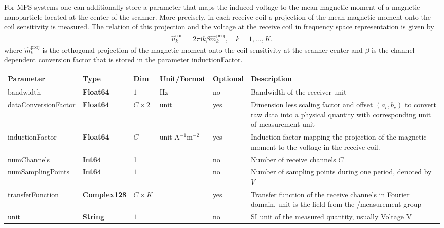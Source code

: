 \documentclass[landscape,a4paper]{article} %
\newcommand{\inltab}[1]{{\ttfamily\bfseries\color{blue}#1}}
\newcommand{\inlvar}[1]{{\ttfamily#1}}
\begin{document}
\begin{multicols}{2}
For MPS systems one can additionally store a parameter that maps the induced voltage to the mean magnetic moment of a magnetic nanoparticle located at the center of the scanner. More precisely, in each receive coil a projection of the mean magnetic moment onto the coil sensitivity is measured. The relation of this projection and the voltage at the receive coil in frequency space representation is given by
\begin{align*}
\hat{u}_k^\text{coil} = 2\pi \textrm{i} k \beta \hat{m}_k^\text{proj} , \quad k=1,\dots,K.
\end{align*}
where  
$\hat m_k^\text{proj}$ is the orthogonal projection of the magnetic moment onto the coil sensitivity at the scanner center
and $\beta$ is the channel dependent conversion factor that is stored in the parameter  \inlvar{inductionFactor}.
\end{multicols}

\noindent \begin{tabularx}{\columnwidth}{lllllX} 
\textbf{Parameter} & \textbf{Type} & \textbf{Dim} & \textbf{Unit/Format} & \textbf{Optional} & \textbf{Description} \\ \hline 
\inlvar{bandwidth} & \inltab{Float64} & $1$ & Hz & no & Bandwidth of the receiver unit \\ \hline
\inlvar{dataConversionFactor} & \inltab{Float64} & $C \times 2$ & \inlvar{unit} & yes & Dimension less scaling factor and offset $(a_c, b_c)$ to convert raw data into a physical quantity with corresponding unit of measurement \inlvar{unit} \\ \hline 
\inlvar{inductionFactor} & \inltab{Float64} & $C$ & \inlvar{unit} A$^{-1}$m$^{-2}$ & yes & Induction factor mapping the projection of the magnetic moment to the voltage in the receive coil.  \\ \hline
\inlvar{numChannels} & \inltab{Int64} & 1 & & no & Number of receive channels $C$ \\ \hline 
\inlvar{numSamplingPoints} & \inltab{Int64} & $1$ &  & no & Number of sampling points during one period, denoted by $V$ \\ \hline
\inlvar{transferFunction} & \inltab{Complex128} & $C \times K$ & & yes & Transfer function of the receive channels in Fourier domain. \inlvar{unit} is the field from the \inlvar{/measurement} group \\ \hline
\inlvar{unit} & \inltab{String} & $1$ & & no & SI unit of the measured quantity, usually Voltage V \\ \hline 
\end{tabularx}
\end{document}
